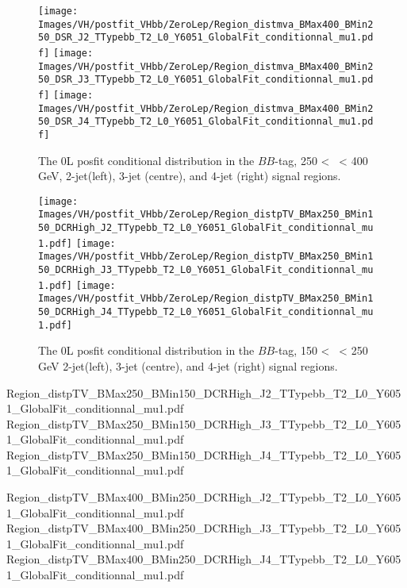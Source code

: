 \begin{figure}[h!]
    \centering
    \texttt{[image: Images/VH/postfit\_VHbb/ZeroLep/Region\_distmva\_BMax400\_BMin250\_DSR\_J2\_TTypebb\_T2\_L0\_Y6051\_GlobalFit\_conditionnal\_mu1.pdf]}
    \texttt{[image: Images/VH/postfit\_VHbb/ZeroLep/Region\_distmva\_BMax400\_BMin250\_DSR\_J3\_TTypebb\_T2\_L0\_Y6051\_GlobalFit\_conditionnal\_mu1.pdf]}
    \texttt{[image: Images/VH/postfit\_VHbb/ZeroLep/Region\_distmva\_BMax400\_BMin250\_DSR\_J4\_TTypebb\_T2\_L0\_Y6051\_GlobalFit\_conditionnal\_mu1.pdf]}
    \caption{The 0L posfit conditional distribution in the $BB$-tag, 250 < \ptv\ < 400 GeV, 2-jet(left), 3-jet (centre), and 4-jet (right) signal regions.}
    \label{fig:plotsVHBSR_250pt_0L}
\end{figure} 

\begin{figure}[h!]
    \centering
    \texttt{[image: Images/VH/postfit\_VHbb/ZeroLep/Region\_distpTV\_BMax250\_BMin150\_DCRHigh\_J2\_TTypebb\_T2\_L0\_Y6051\_GlobalFit\_conditionnal\_mu1.pdf]}
    \texttt{[image: Images/VH/postfit\_VHbb/ZeroLep/Region\_distpTV\_BMax250\_BMin150\_DCRHigh\_J3\_TTypebb\_T2\_L0\_Y6051\_GlobalFit\_conditionnal\_mu1.pdf]}
    \texttt{[image: Images/VH/postfit\_VHbb/ZeroLep/Region\_distpTV\_BMax250\_BMin150\_DCRHigh\_J4\_TTypebb\_T2\_L0\_Y6051\_GlobalFit\_conditionnal\_mu1.pdf]}
    \caption{The 0L posfit conditional distribution in the $BB$-tag, 150 < \ptv\ < 250 GeV 2-jet(left), 3-jet (centre), and 4-jet (right) signal regions.}
    \label{fig:plotsVHBSR_150pt_0L}
\end{figure} 


Region_distpTV_BMax250_BMin150_DCRHigh_J2_TTypebb_T2_L0_Y6051_GlobalFit_conditionnal_mu1.pdf
Region_distpTV_BMax250_BMin150_DCRHigh_J3_TTypebb_T2_L0_Y6051_GlobalFit_conditionnal_mu1.pdf
Region_distpTV_BMax250_BMin150_DCRHigh_J4_TTypebb_T2_L0_Y6051_GlobalFit_conditionnal_mu1.pdf

Region_distpTV_BMax400_BMin250_DCRHigh_J2_TTypebb_T2_L0_Y6051_GlobalFit_conditionnal_mu1.pdf
Region_distpTV_BMax400_BMin250_DCRHigh_J3_TTypebb_T2_L0_Y6051_GlobalFit_conditionnal_mu1.pdf
Region_distpTV_BMax400_BMin250_DCRHigh_J4_TTypebb_T2_L0_Y6051_GlobalFit_conditionnal_mu1.pdf